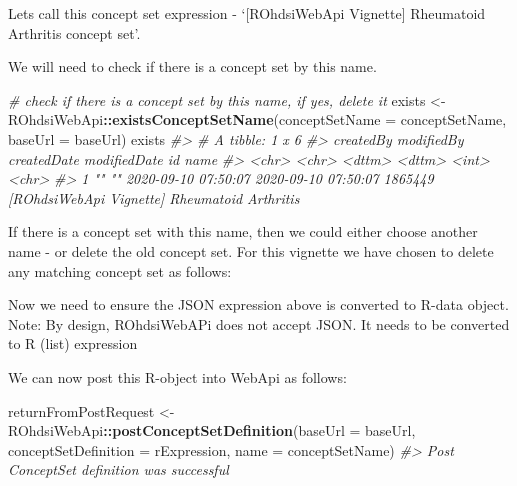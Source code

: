 \documentclass[
]{article}
\newenvironment{Shaded}{\begin{snugshade}}{\end{snugshade}}
\newcommand{\CommentTok}[1]{\textcolor[rgb]{0.56,0.35,0.01}{\textit{#1}}}
\newcommand{\ControlFlowTok}[1]{\textcolor[rgb]{0.13,0.29,0.53}{\textbf{#1}}}
\newcommand{\DataTypeTok}[1]{\textcolor[rgb]{0.13,0.29,0.53}{#1}}
\newcommand{\KeywordTok}[1]{\textcolor[rgb]{0.13,0.29,0.53}{\textbf{#1}}}
\newcommand{\NormalTok}[1]{#1}
\newcommand{\OperatorTok}[1]{\textcolor[rgb]{0.81,0.36,0.00}{\textbf{#1}}}
\newcommand{\StringTok}[1]{\textcolor[rgb]{0.31,0.60,0.02}{#1}}
\begin{document}
Lets call this concept set expression - `{[}ROhdsiWebApi Vignette{]}
Rheumatoid Arthritis concept set'.

We will need to check if there is a concept set by this name.

\begin{Shaded}
\begin{Highlighting}[]
\CommentTok{# check if there is a concept set by this name, if yes, delete it}
\NormalTok{exists <-}\StringTok{ }\NormalTok{ROhdsiWebApi}\OperatorTok{::}\KeywordTok{existsConceptSetName}\NormalTok{(}\DataTypeTok{conceptSetName =}\NormalTok{ conceptSetName, }\DataTypeTok{baseUrl =}\NormalTok{ baseUrl)}
\NormalTok{exists}
\CommentTok{#> # A tibble: 1 x 6}
\CommentTok{#>   createdBy modifiedBy createdDate         modifiedDate             id name                                         }
\CommentTok{#>   <chr>     <chr>      <dttm>              <dttm>                <int> <chr>                                        }
\CommentTok{#> 1 ""        ""         2020-09-10 07:50:07 2020-09-10 07:50:07 1865449 [ROhdsiWebApi Vignette] Rheumatoid Arthritis~}
\end{Highlighting}
\end{Shaded}

If there is a concept set with this name, then we could either choose
another name - or delete the old concept set. For this vignette we have
chosen to delete any matching concept set as follows:

\begin{Shaded}
\end{Shaded}

Now we need to ensure the JSON expression above is converted to R-data
object. Note: By design, ROhdsiWebAPi does not accept JSON. It needs to
be converted to R (list) expression

We can now post this R-object into WebApi as follows:

\begin{Shaded}
\begin{Highlighting}[]
\NormalTok{returnFromPostRequest <-}\StringTok{ }\NormalTok{ROhdsiWebApi}\OperatorTok{::}\KeywordTok{postConceptSetDefinition}\NormalTok{(}\DataTypeTok{baseUrl =}\NormalTok{ baseUrl, }
                                                                \DataTypeTok{conceptSetDefinition =}\NormalTok{ rExpression, }
                                                                \DataTypeTok{name =}\NormalTok{ conceptSetName)}
\CommentTok{#> Post ConceptSet definition was successful}
\end{Highlighting}
\end{Shaded}
\end{document}
